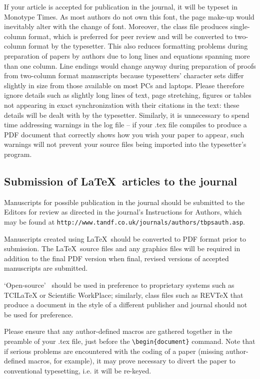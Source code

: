\documentclass{tBPS2e}
\theoremstyle{plain}
\theoremstyle{definition}
\theoremstyle{remark}
\begin{document}
If your article is accepted for publication in the journal, it will be typeset in Monotype Times. As most authors do not own this font, the page make-up would inevitably alter with the change of font. Moreover, the class file produces single-column format, which is preferred for peer review and will be converted to two-column format by the typesetter. This also reduces formatting problems during preparation of papers by authors due to long lines and equations spanning more than one column. Line endings would change anyway during preparation of proofs from two-column format manuscripts because typesetters' character sets differ slightly in size from those available on most PCs and laptops. Please therefore ignore details such as slightly long lines of text, page stretching, figures or tables not appearing in exact synchronization with their citations in the text: these details will be dealt with by the typesetter. Similarly, it is unnecessary to spend time addressing warnings in the log file -- if your .tex file compiles to produce a PDF document that correctly shows how you wish your paper to appear, such warnings will not prevent your source files being imported into the typesetter's program.


\subsection{Submission of \LaTeX\ articles to the journal}\label{submission}

Manuscripts for possible publication in the journal should be submitted to the Editors for review as directed in the journal's Instructions for Authors, which may be found at \texttt{http://www.tandf.co.uk/journals/authors/tbpsauth.asp}.

Manuscripts created using \LaTeX\ should be converted to PDF format prior to submission. The \LaTeX\ source files and any graphics files will be required in addition to the final PDF version when final, revised versions of accepted manuscripts are submitted.

`Open-source' \LaTeXe\ should be used in preference to proprietary systems such as TCILaTeX or Scientific WorkPlace; similarly, class files such as REVTeX that produce a document in the style of a different publisher and journal should not be used for preference.

Please ensure that any author-defined macros are gathered together in the preamble of your .tex file, just before the
\verb"\begin{document}" command. Note that if serious problems are encountered with the coding of a paper (missing author-defined macros,
for example), it may prove necessary to divert the paper to conventional typesetting, i.e. it will be re-keyed.
\end{document}
